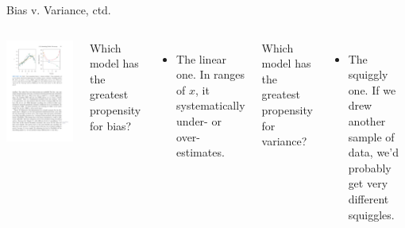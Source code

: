 \documentclass[aspectratio=169, handout]{beamer}
\begin{document}
\begin{frame}{Bias v. Variance, ctd.}


\begin{columns}

\includegraphics[scale=1]{figures/islr2_9a.pdf}


Which model has the greatest propensity for bias?
\begin{itemize}
\item<2-> The linear one.  In ranges of $x$, it systematically under- or over-estimates. 
\end{itemize}

\hspace{5mm}

Which model has the greatest propensity for variance?
\begin{itemize}
\item<3-> The squiggly one.  If we drew another sample of data, we'd probably get very different squiggles.
\end{itemize}
\end{columns}



\end{frame}
\end{document}
